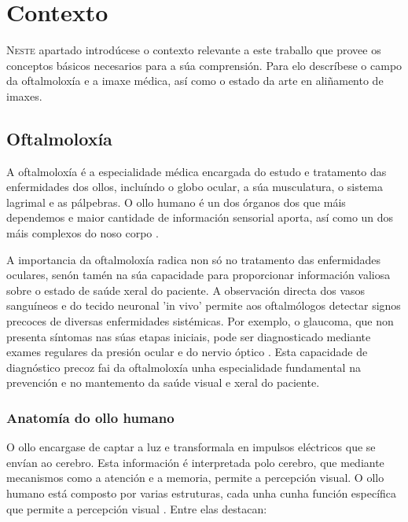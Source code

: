 \chapter{Contexto}
\label{chap:contexto}

\lettrine{N}{este} apartado introdúcese o contexto relevante a este traballo que provee os conceptos básicos necesarios para a súa comprensión.
Para elo descríbese o campo da oftalmoloxía e a imaxe médica, así como o estado da arte en aliñamento de imaxes.
\section{Oftalmoloxía}
\label{sec:Oftalmoloxía}
A oftalmoloxía é a especialidade médica encargada do estudo e tratamento das enfermidades dos ollos, incluíndo o globo ocular, a súa musculatura, o sistema lagrimal e as pálpebras.
O ollo humano é un dos órganos dos que máis dependemos e maior cantidade de información sensorial aporta, así como un dos máis complexos do noso corpo \cite{kanski2011clinical}.

A importancia da oftalmoloxía radica non só no tratamento das enfermidades oculares, senón tamén na súa capacidade para proporcionar información valiosa sobre o estado de saúde xeral do paciente. 
A observación directa dos vasos sanguíneos e do tecido neuronal 'in vivo' permite aos oftalmólogos detectar signos precoces de diversas enfermidades sistémicas.
 Por exemplo, o glaucoma, que non presenta síntomas nas súas etapas iniciais, pode ser diagnosticado mediante exames regulares da presión ocular e do nervio óptico \cite{importglaucoma}.
 Esta capacidade de diagnóstico precoz fai da oftalmoloxía unha especialidade fundamental na prevención e no mantemento da saúde visual e xeral do paciente.

 \subsection{Anatomía do ollo humano}
\label{subsec:Anatomía do ollo humano}
O ollo encargase de captar a luz e transformala en impulsos eléctricos que se envían ao cerebro.
 Esta información é interpretada polo cerebro, que mediante mecanismos como a atención e a memoria, permite a percepción visual. \cite{eyefunct}
 O ollo humano está composto por varias estruturas, cada unha cunha función específica que permite a percepción visual \cite{eyeanat}. Entre elas destacan:

